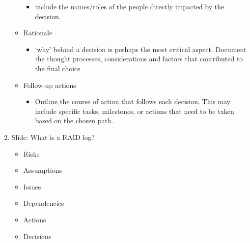 \documentclass{article}
\begin{document}
\begin{enumerate}
\begin{itemize}
        \begin{itemize}
            \item include the names/roles of the people directly impacted by the decision.
        \end{itemize}
        \item Rationale
        \begin{itemize}
            \item `why' behind a decision is perhaps the most critical aspect. Document the thought processes, considerations and factors that contributed to the final choice
        \end{itemize}
        \item Follow-up actions
        \begin{itemize}
            \item Outline the course of action that follows each decision. This may include specific tasks, milestones, or actions that need to be taken based on the chosen path.
        \end{itemize}
    \end{itemize}
    \item Slide: What is a RAID log?
    \begin{itemize}
        \item Risks
        \item Assumptions
        \item Issues
        \item Dependencies
        \item Actions
        \item Decisions
    \end{itemize}
\end{enumerate}
\end{document}
